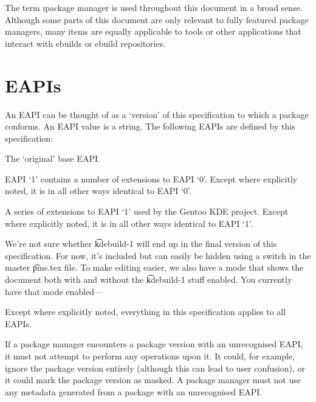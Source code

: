 The term \i{package manager} is used throughout this document in a broad sense. Although some parts
of this document are only relevant to fully featured package managers, many items are equally
applicable to tools or other applications that interact with ebuilds or ebuild repositories.

\section{EAPIs}

An EAPI can be thought of as a `version' of this specification to which a package conforms. An EAPI
value is a string. The following EAPIs are defined by this specification:

\begin{description}
\item[0] The `original' base EAPI.
\item[1] EAPI `1' contains a number of extensions to EAPI `0'. Except where explicitly noted, it is
    in all other ways identical to EAPI `0'.
\IFKDEBUILDELSE
{
    \item[kdebuild-1] A series of extensions to EAPI `1' used by the Gentoo KDE project. Except where
        explicitly noted, it is in all other ways identical to EAPI `1'.
}{
}
\end{description}

{
    \note We're not sure whether \t{kdebuild-1} will end up in the final version of this
    specification. For now, it's included but can easily be hidden using a switch in the master
    \t{pms.tex} file. To make editing easier, we also have a mode that shows the document both with
    and without the \t{kdebuild-1} stuff enabled. You currently have that mode enabled---
}{
}

Except where explicitly noted, everything in this specification applies to all EAPIs.

If a package manager encounters a package version with an unrecognised EAPI, it must not attempt to
perform any operations upon it. It could, for example, ignore the package version entirely (although
this can lead to user confusion), or it could mark the package version as masked. A package manager
must not use any metadata generated from a package with an unrecognised EAPI.

